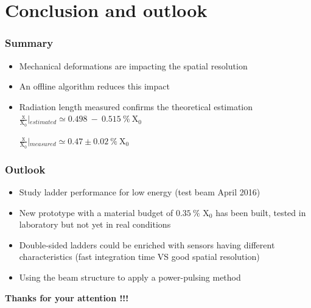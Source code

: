\documentclass{beamer}
\begin{document}
    
  \section{Conclusion and outlook} 

  \begin{frame}
    \frametitle{Summary}

    \begin{itemize}
      \item Mechanical deformations are impacting the spatial resolution
      \item An offline algorithm reduces this impact
      \item Radiation length measured confirms the theoretical estimation $\frac{\text{x}}{\text{X}_0}\left|_{estimated} \simeq 0.498~-~0.515~\%~\text{X}_0 \right.$

         $\frac{\text{x}}{\text{X}_0}\left|_{measured} \simeq 0.47 \pm 0.02~\%~\text{X}_0 \right.$  
    \end{itemize}

  \end{frame}

  \begin{frame}
    \frametitle{Outlook}

    \begin{itemize}
      \item Study ladder performance for low energy (test beam April 2016)
      \item New prototype with a material budget of $0.35~\%$ X$_0$ has been built, tested in laboratory but not yet in real conditions
      \item Double-sided ladders could be enriched with sensors having different characteristics (fast integration time VS good spatial resolution)
      \item Using the beam structure to apply a power-pulsing method
    \end{itemize}

  \end{frame}

  \begin{frame}
    \begin{center}
      \huge
      \textbf{Thanks for your attention !!!}
    \end{center}
  \end{frame}

  \appendix
  \setcounter{lastframe}{\insertframenumber}
\end{document}
